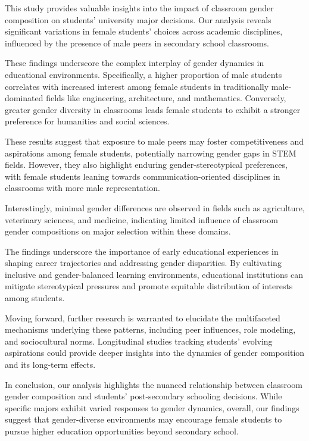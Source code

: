 
This study provides valuable insights into the impact of classroom gender composition on students' university major decisions. Our analysis reveals significant variations in female students' choices across academic disciplines, influenced by the presence of male peers in secondary school classrooms.

These findings underscore the complex interplay of gender dynamics in educational environments. Specifically, a higher proportion of male students correlates with increased interest among female students in traditionally male-dominated fields like engineering, architecture, and mathematics. Conversely, greater gender diversity in classrooms leads female students to exhibit a stronger preference for humanities and social sciences.

These results suggest that exposure to male peers may foster competitiveness and aspirations among female students, potentially narrowing gender gaps in STEM fields. However, they also highlight enduring gender-stereotypical preferences, with female students leaning towards communication-oriented disciplines in classrooms with more male representation.

Interestingly, minimal gender differences are observed in fields such as agriculture, veterinary sciences, and medicine, indicating limited influence of classroom gender compositions on major selection within these domains.

The findings underscore the importance of early educational experiences in shaping career trajectories and addressing gender disparities. By cultivating inclusive and gender-balanced learning environments, educational institutions can mitigate stereotypical pressures and promote equitable distribution of interests among students.

Moving forward, further research is warranted to elucidate the multifaceted mechanisms underlying these patterns, including peer influences, role modeling, and sociocultural norms. Longitudinal studies tracking students' evolving aspirations could provide deeper insights into the dynamics of gender composition and its long-term effects.

In conclusion, our analysis highlights the nuanced relationship between classroom gender composition and students' post-secondary schooling decisions. While specific majors exhibit varied responses to gender dynamics, overall, our findings suggest that gender-diverse environments may encourage female students to pursue higher education opportunities beyond secondary school.
